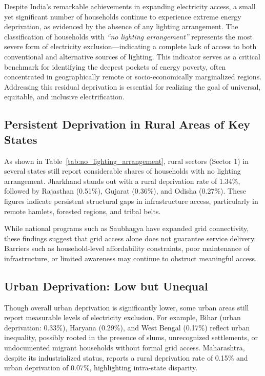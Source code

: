 \documentclass{article}
\begin{document}
Despite India's remarkable achievements in expanding electricity access, a small yet significant number of households continue to experience extreme energy deprivation, as evidenced by the absence of any lighting arrangement. The classification of households with \textit{``no lighting arrangement''} represents the most severe form of electricity exclusion—indicating a complete lack of access to both conventional and alternative sources of lighting. This indicator serves as a critical benchmark for identifying the deepest pockets of energy poverty, often concentrated in geographically remote or socio-economically marginalized regions. Addressing this residual deprivation is essential for realizing the goal of universal, equitable, and inclusive electrification.


\subsection*{Persistent Deprivation in Rural Areas of Key States}

As shown in Table~\ref{tab:no_lighting_arrangement}, rural sectors (Sector 1) in several states still report considerable shares of households with no lighting arrangement. Jharkhand stands out with a rural deprivation rate of 1.34\%, followed by Rajasthan (0.51\%), Gujarat (0.36\%), and Odisha (0.27\%). These figures indicate persistent structural gaps in infrastructure access, particularly in remote hamlets, forested regions, and tribal belts.

While national programs such as Saubhagya have expanded grid connectivity, these findings suggest that grid access alone does not guarantee service delivery. Barriers such as household-level affordability constraints, poor maintenance of infrastructure, or limited awareness may continue to obstruct meaningful access.

\subsection*{Urban Deprivation: Low but Unequal}

Though overall urban deprivation is significantly lower, some urban areas still report measurable levels of electricity exclusion. For example, Bihar (urban deprivation: 0.33\%), Haryana (0.29\%), and West Bengal (0.17\%) reflect urban inequality, possibly rooted in the presence of slums, unrecognized settlements, or undocumented migrant households without formal grid access. Maharashtra, despite its industrialized status, reports a rural deprivation rate of 0.15\% and urban deprivation of 0.07\%, highlighting intra-state disparity.
\end{document}
